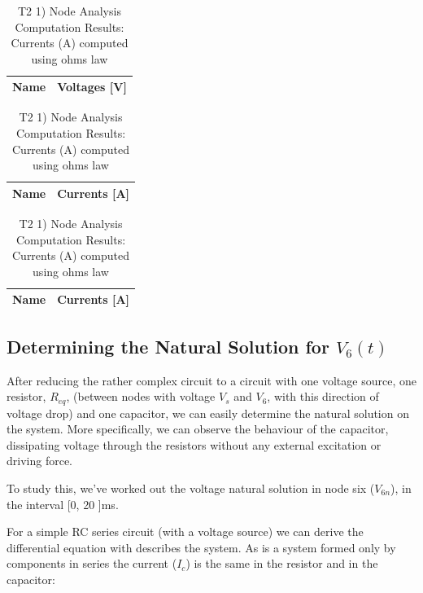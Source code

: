 \begin{table}[h]
  \centering
  \begin{tabular}{|l|r|}
    \hline    
    {\bf Name} & {\bf Voltages [V]} \\ \hline
    
  \end{tabular}
  \caption{T2 1) Node Analysis Computation Results: Currents (A) computed using ohms law}
  \label{tab:nodeVoltages2}
\end{table}


\begin{table}[h]
  \centering
  \begin{tabular}{|l|r|}
    \hline    
    {\bf Name} & {\bf Currents [A]} \\ \hline
    
  \end{tabular}
  \caption{T2 1) Node Analysis Computation Results: Currents (A) computed using ohms law}
  \label{tab:nodeCurrents2}
\end{table}

\begin{table}[h]
  \centering
  \begin{tabular}{|l|r|}
    \hline    
    {\bf Name} & {\bf Currents [A]} \\ \hline
    
  \end{tabular}
  \caption{T2 1) Node Analysis Computation Results: Currents (A) computed using ohms law}
  \label{tab:nodeCurrents2}
\end{table}


\subsection{Determining the Natural Solution for $V_6(t)$}

After reducing the rather complex circuit to a circuit with one voltage source, one resistor, $R_{eq}$, (between nodes with voltage $V_s$ and $V_6$, with this direction of voltage drop) and one capacitor, we can easily determine the natural solution on the system. More specifically, we can observe the behaviour of the capacitor, dissipating voltage through the resistors without any external excitation or driving force. 

To study this, we've worked out the voltage natural solution in node six ($V_{6n}$), in the interval [0, 20 ]ms.

For a simple RC series circuit (with a voltage source) we can derive  the differential equation with describes the system. As is a system formed only by components in series the current ($I_c$) is the same in the resistor and in the capacitor: 

